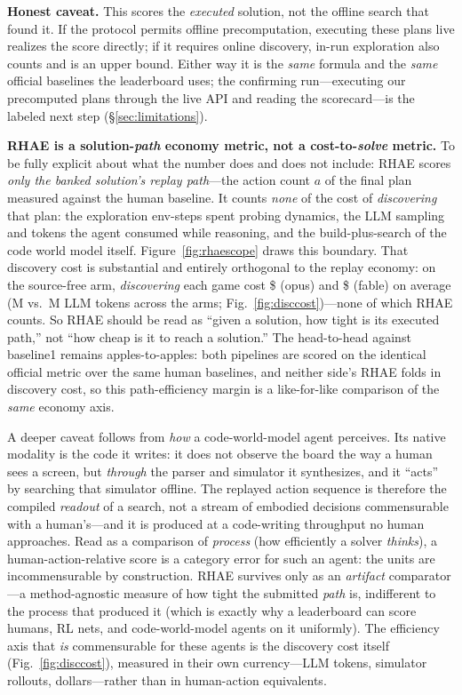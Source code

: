 \documentclass[11pt]{article}
\begin{document}
\textbf{Honest caveat.} This scores the \emph{executed} solution, not the offline search that found it.
If the protocol permits offline precomputation, executing these plans live realizes the score directly; if
it requires online discovery, in-run exploration also counts and \ArcRhaeMean{} is an upper bound. Either way it is the \emph{same}
formula and the \emph{same} official baselines the leaderboard uses; the confirming run---executing our
precomputed plans through the live API and reading the scorecard---is the labeled next step
(\S\ref{sec:limitations}).

\medskip
\noindent\textbf{RHAE is a solution-\emph{path} economy metric, not a cost-to-\emph{solve} metric.}
To be fully explicit about what the number does and does not include: RHAE scores \emph{only the banked
solution's replay path}---the action count $a$ of the final plan measured against the human baseline. It
counts \emph{none} of the cost of \emph{discovering} that plan: the exploration env-steps spent probing
dynamics, the LLM sampling and tokens the agent consumed while reasoning, and the build-plus-search of
the code world model itself. Figure~\ref{fig:rhaescope} draws this boundary. That discovery cost is
substantial and entirely orthogonal to the replay economy: on the source-free arm, \emph{discovering}
each game cost \$\ArcDiscCostOpus{} (opus) and \$\ArcDiscCostFable{} (fable) on average
(\ArcDiscTokOpus{}M vs.\ \ArcDiscTokFable{}M LLM tokens across the arms; Fig.~\ref{fig:disccost})---none
of which RHAE counts. So RHAE should be read as ``given a solution, how tight is its executed path,''
not ``how cheap is it to reach a solution.'' The head-to-head against baseline1 remains
apples-to-apples: both pipelines are scored on the identical official metric over the same human
baselines, and neither side's RHAE folds in discovery cost, so this path-efficiency margin is
a like-for-like comparison of the \emph{same} economy axis.

\medskip
\noindent A deeper caveat follows from \emph{how} a code-world-model agent perceives. Its native
modality is the code it writes: it does not observe the board the way a human sees a screen, but
\emph{through} the parser and simulator it synthesizes, and it ``acts'' by searching that simulator
offline. The replayed action sequence is therefore the compiled \emph{readout} of a search, not a
stream of embodied decisions commensurable with a human's---and it is produced at a code-writing
throughput no human approaches. Read as a comparison of \emph{process} (how efficiently a solver
\emph{thinks}), a human-action-relative score is a category error for such an agent: the units are
incommensurable by construction. RHAE survives only as an \emph{artifact} comparator---a
method-agnostic measure of how tight the submitted \emph{path} is, indifferent to the process that
produced it (which is exactly why a leaderboard can score humans, RL nets, and code-world-model agents
on it uniformly). The efficiency axis that \emph{is} commensurable for these agents is the discovery
cost itself (Fig.~\ref{fig:disccost}), measured in their own currency---LLM tokens, simulator rollouts,
dollars---rather than in human-action equivalents.
\end{document}
